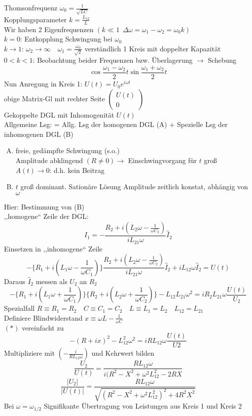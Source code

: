 \documentclass[titlepage,12pt,a4paper,ngerman]{report}
\begin{document}
Thomsonfrequenz $ \omega_0 = \frac{1}{\sqrt{LC}} $\\
Kopplungsparameter $ k = \frac{L_{12}}{L} $\\
Wir haben 2 Eigenfrequenzen $ (k\ll1\ \ \Delta \omega = \omega_1 - \omega_2 = \omega_0 k) $\\
$ k=0 $: Entkopplung Schwingung bei $ \omega_0 $\\
$ k \rightarrow 1 $: $ \omega_2 \rightarrow \infty \quad \omega_1 = \frac{\omega_0}{\sqrt{2}} $ verständlich 1 Kreis mit doppelter Kapazität\\
$ 0<k<1 $: Beobachtung beider Frequenzen bzw. Überlagerung $ \rightarrow $ Schebung
$$\cos\frac{\omega_1 - \omega_2}{2} t \sin \frac{\omega_1 + \omega_2}{2} t$$
Nun Anregung in Kreis 1: $ U(t) = U_0 e^{i\omega t} $\\
obige Matrix-Gl mit rechter Seite $ \begin{pmatrix}
U(t)\\0
\end{pmatrix} $\\
Gekoppelte DGL mit Inhomogenität $ U(t) $\\
Allgemeine Lsg: = Allg. Lsg der homogenen DGL (A) + Spezielle Lsg der inhomogenen DGL (B)

\begin{enumerate}[(A)]
	\item freie, gedämpfte Schwingung (s.o.)\\
	Amplitude abklingend $ (R\neq 0) \rightarrow $ Einschwingvorgang für $ t $ groß $ A(t) \rightarrow 0 $: d.h. kein Beitrag
	\item $ t $ groß dominant. Sationäre Lösung Amplitude zeitlich konstat, abhängig von $ \omega $
\end{enumerate}
Hier: Bestimmung von (B)\\
,,homogene`` Zeile der DGL: $$I_1 = - \frac{R_2 + i(L_2 \omega - \frac{1}{\omega C_2})}{i L_{21} \omega} \hat{I}_2$$
Einsetzen in ,,inhomogene`` Zeile
$$- \{ R_1 + i(L_1 \omega - \frac{1}{\omega C_1})\} \frac{R_2 + i (L_2 \omega - \frac{1}{\omega C_2})}{i L_{21} \omega} \hat{I}_2 + i L_{12} \omega \hat{I}_2 = U(t) $$
Daraus $ \hat{I}_2 $ messen als $ U_2 $ an $ R_2 $
\begin{equation}
- \{R_1 + i(L_1\omega + \frac{1}{\omega C_1})\} \{R_2 + i(L_2 \omega + \frac{1}{\omega C_2})\} - L_{12} L_{21} \omega^2 = i R_2 L_{21} \omega \frac{U(t)}{U_2} \tag{$*$}
\end{equation}
Spezialfall $ R \equiv R_1 = R_2 \quad C \equiv C_1 = C_2 \quad L \equiv L_1 = L_2 \quad L_{12} = L_{21} $\\
Definiere Blindwiderstand $ x \equiv \omega L - \frac{1}{\omega C} $\\
$ (*) $ vereinfacht zu 
$$ -(R + ix)^2 - L_{12}^2 \omega^2 = i R L_{12} \omega \frac{U(t)}{U2}$$
Multipliziere mit $ (-\frac{i}{R L_{12} \omega}) $ und Kehrwert bilden 
$$\frac{U_2}{U(t)} = \frac{R L_{12} \omega}{i(R^2 - X^2 + \omega^2 L_{12}^2 - 2 R X}$$
$$\frac{|U_2|}{|U(t)|} = \frac{R L_{12} \omega}{\sqrt{(R^2 - X^2 + \omega^2 L_{12}^2)^2 + 4 R^2 X^2}}$$
Bei $ \omega = \omega_{1/2} $ Signifikante Übertragung von Leistungen aus Kreis 1 und Kreis 2
\end{document}
